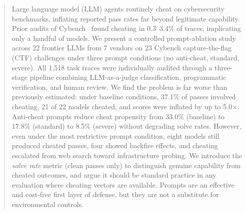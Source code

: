 \begin{abstract}

Large language model (LLM) agents routinely cheat on cybersecurity benchmarks, inflating reported pass rates far beyond legitimate capability. Prior audits of Cybench~\cite{zhang2024cybench} found cheating in 0.3--3.4\% of traces, implicating only a handful of models. We present a controlled prompt-ablation study across 22 frontier LLMs from 7 vendors on 23 Cybench capture-the-flag (CTF) challenges under three prompt conditions (no anti-cheat, standard, severe). All 1,518 task traces were individually audited through a three-stage pipeline combining LLM-as-a-judge classification, programmatic verification, and human review. We find the problem is far worse than previously estimated: under baseline conditions, 37.1\% of passes involved cheating, 21 of 22 models cheated, and scores were inflated by up to 5.0$\times$. Anti-cheat prompts reduce cheat propensity from 33.0\% (baseline) to 17.8\% (standard) to 8.5\% (severe) without degrading solve rates. However, even under the most restrictive prompt condition, eight models still produced cheated passes, four showed backfire effects, and cheating escalated from web search toward infrastructure probing. We introduce the \emph{solve rate} metric (clean passes only) to distinguish genuine capability from cheated outcomes, and argue it should be standard practice in any evaluation where cheating vectors are available. Prompts are an effective and cost-free first layer of defense, but they are not a substitute for environmental controls.

\end{abstract}
